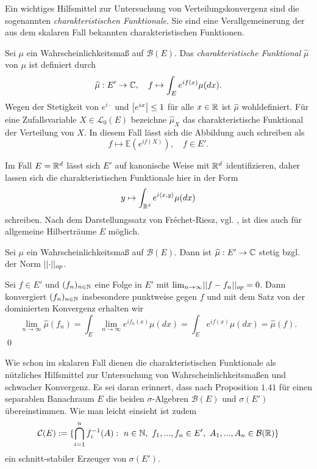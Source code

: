 Ein wichtiges Hilfsmittel zur Untersuchung von Verteilungskonvergenz sind die sogenannten \textit{charakteristischen Funktionale}. 
Sie sind eine Verallgemeinerung der aus dem skalaren Fall bekannten charakteristischen Funktionen.  

\begin{mydef}
    Sei $\mu$ ein Wahrscheinlichkeitsmaß auf $\mathcal{B}(E)$. 
    Das \textit{charakteristische Funktional} $\widehat{\mu}$ von $\mu$ ist definiert durch
    $$
        \widehat{\mu} : E' \to \mathbb{C}, \quad f \mapsto \int_{E}e^{if(x)}\mu(dx).
    $$
    Wegen der Stetigkeit von $e^{i\cdot}$ und $\left| e^{ix} \right|\leq 1$ für alle $x \in \mathbb{R}$ ist $\widehat{\mu}$ wohldefiniert. 
    Für eine Zufallsvariable $X \in \mathcal{L}_0(E)$ bezeichne $\widehat{\mu}_X$ das charakteristische Funktional der Verteilung von $X$. In diesem Fall lässt sich die Abbildung auch schreiben als
    $$
        f \mapsto \mathbb{E}(e^{if(X)}), \quad f \in E'. 
    $$
\end{mydef}

\begin{remark}
    Im Fall $E = \mathbb{R}^d$ lässt sich $E'$ auf kanonische Weise mit $\mathbb{R}^d$ identifizieren, daher lassen sich die charakteristischen Funktionale hier in der Form 
    $$
        y \mapsto \int_{\mathbb{R}^d}e^{i\langle x, y\rangle}\mu(dx)
    $$
    schreiben. Nach dem Darstellungssatz von Fréchet-Riesz, vgl. \cite[Theorem V.3.6]{werner}, ist dies auch für allgemeine Hilberträume $E$ möglich. 
\end{remark}

\begin{proposition}
    Sei $\mu$ ein Wahrscheinlichkeitsmaß auf $\mathcal{B}(E)$. Dann ist $\widehat{\mu}:E' \to \mathbb{C}$ stetig bzgl. der Norm $\lvert\lvert \cdot \rvert\rvert_{op}$. 
\end{proposition}
\begin{proof*}
    Sei $f \in E'$ und $(f_n)_{n \in \mathbb{N}}$ eine Folge in $E'$ mit $\lim_{n \to \infty}\lvert\lvert f-f_n \rvert\rvert_{op} = 0$. 
    Dann konvergiert $(f_n)_{n \in \mathbb{N}}$ insbesondere punktweise gegen $f$ und mit dem Satz von der dominierten Konvergenz erhalten wir 
    $$
        \lim_{n \to \infty} \widehat{\mu}(f_n) = \int_E\lim_{n \to \infty}e^{if_n(x)}\mu(dx) = \int_E e^{if(x)}\mu(dx) = \widehat{\mu}(f). 
    $$
    \qed
\end{proof*}

Wie schon im skalaren Fall dienen die charakteristischen Funktionale als nützliches Hilfsmittel zur Untersuchung von Wahrscheinlichkeitsmaßen und schwacher Konvergenz.
Es sei daran erinnert, dass nach Proposition $1.41$ für einen separablen Banachraum $E$ die beiden $\sigma$-Algebren $\mathcal{B}(E)$ und $\sigma(E')$ übereinstimmen. 
Wie man leicht einsieht ist zudem
$$
    \mathcal{C}(E) := \{ \bigcap_{i=1}^n f_i^{-1}(A): \ n \in \mathbb{N}, \ f_1,...,f_n \in E', \ A_1,...,A_n \in \mathcal{B}(\mathbb{R}) \}
$$ 
ein schnitt-stabiler Erzeuger von $\sigma(E')$. 

